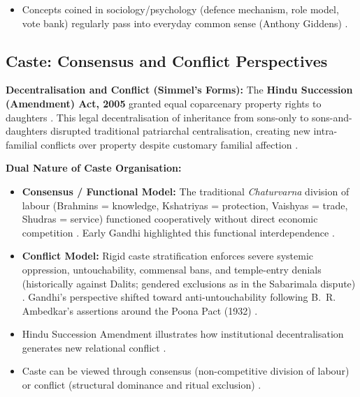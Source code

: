 \begin{QuickRevision}
\begin{itemize}
    \item Concepts coined in sociology/psychology (defence mechanism, role model, vote bank) regularly pass into everyday common sense (Anthony Giddens) .
\end{itemize}
\end{QuickRevision}

\subsection{Caste: Consensus and Conflict Perspectives}

\begin{GovtPolicy}
\textbf{Decentralisation and Conflict (Simmel's Forms):}
The \textbf{Hindu Succession (Amendment) Act, 2005} granted equal coparcenary property rights to daughters . This legal decentralisation of inheritance from sons-only to sons-and-daughters disrupted traditional patriarchal centralisation, creating new intra-familial conflicts over property despite customary familial affection .
\end{GovtPolicy}

\begin{ComparisonBox}
\textbf{Dual Nature of Caste Organisation:}
\begin{itemize}
    \item \textbf{Consensus / Functional Model:} The traditional \textit{Chaturvarna} division of labour (Brahmins = knowledge, Kshatriyas = protection, Vaishyas = trade, Shudras = service) functioned cooperatively without direct economic competition . Early Gandhi highlighted this functional interdependence .
    \item \textbf{Conflict Model:} Rigid caste stratification enforces severe systemic oppression, untouchability, commensal bans, and temple-entry denials (historically against Dalits; gendered exclusions as in the Sabarimala dispute) . Gandhi's perspective shifted toward anti-untouchability following B.~R. Ambedkar's assertions around the Poona Pact (1932) .
\end{itemize}
\end{ComparisonBox}

\begin{QuickRevision}
\begin{itemize}
    \item Hindu Succession Amendment illustrates how institutional decentralisation generates new relational conflict .
    \item Caste can be viewed through consensus (non-competitive division of labour) or conflict (structural dominance and ritual exclusion) .
\end{itemize}
\end{QuickRevision}

